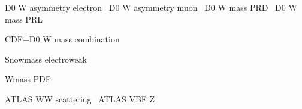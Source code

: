 \documentclass[12pt]{iopart}
\begin{document}
D0 W asymmetry electron~\cite{Abazov:2013dsa}
D0 W asymmetry muon~\cite{Abazov:2013rja}
D0 W mass PRD~\cite{D0:2013jba}
D0 W mass PRL~\cite{Abazov:2012bv}

CDF+D0 W mass combination~\cite{Aaltonen:2013iut}

Snowmass electroweak~\cite{Baak:2013fwa}

Wmass PDF~\cite{Bozzi:2011ww}

ATLAS WW scattering~\cite{Aad:2014zda}
ATLAS VBF Z~\cite{Aad:2014dta}


\end{document}
